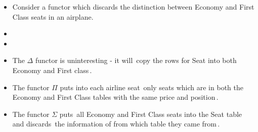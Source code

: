 \begin{itemize}
    \item Consider a functor which discards the distinction between Economy and First Class seats in an airplane.
    \item {}
    \item {}
    \item The $\Delta$ functor is uninteresting - it will \,copy the rows for Seat into both Economy and First class\,.
    \item The functor $\Pi$ puts into each airline seat \,only seats which are in both the Economy and First Class tables with the same price and position\,.
    \item The functor $\Sigma$ puts \,all Economy and First Class seats into the Seat table\, and discards \,the information of from which table they came from\,.
  \end{itemize}
